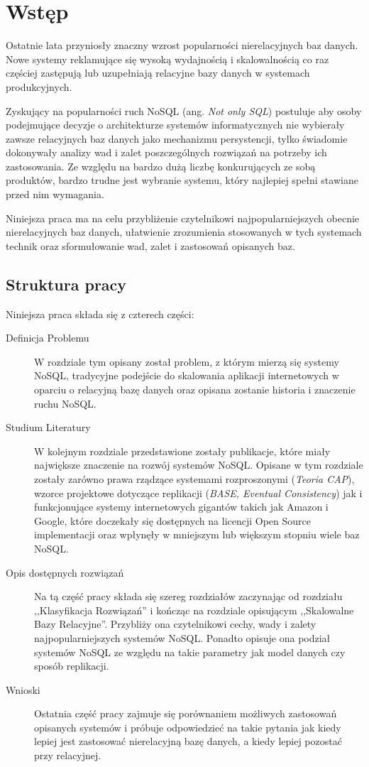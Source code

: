 \chapter{Wstęp}

Ostatnie lata przyniosły znaczny wzrost popularności nierelacyjnych baz danych.
Nowe systemy reklamujące się wysoką wydajnością i skalowalnością co raz częściej zastępują lub uzupełniają relacyjne bazy danych w systemach produkcyjnych.

Zyskujący na popularności ruch NoSQL (ang. \emph{Not only SQL}) postuluje aby osoby podejmujące decyzje o architekturze systemów informatycznych nie wybierały zawsze relacyjnych baz danych jako mechanizmu persystencji, tylko świadomie dokonywały analizy wad i zalet poszczególnych rozwiązań na potrzeby ich zastosowania.
Ze względu na bardzo dużą liczbę konkurujących ze sobą produktów, bardzo trudne jest wybranie systemu, który najlepiej spełni stawiane przed nim wymagania.

Niniejsza praca ma na celu przybliżenie czytelnikowi najpopularniejszych obecnie nierelacyjnych baz danych, ułatwienie zrozumienia stosowanych w tych systemach technik oraz sformułowanie wad, zalet i zastosowań opisanych baz.

\section{Struktura pracy}

Niniejsza praca składa się z czterech części:

\begin{description}
 \item[Definicja Problemu]
 W rozdziale tym opisany został problem, z którym mierzą się systemy NoSQL, tradycyjne podejście do skalowania aplikacji internetowych w oparciu o relacyjną bazę danych oraz opisana zostanie historia i znaczenie ruchu NoSQL.
 \item[Studium Literatury]
 W kolejnym rozdziale przedstawione zostały publikacje, które miały największe znaczenie na rozwój systemów NoSQL.
 Opisane w tym rozdziale zostały zarówno prawa rządzące systemami rozproszonymi (\emph{Teoria CAP}), wzorce projektowe dotyczące replikacji (\emph{BASE, Eventual Consistency}) jak i funkcjonujące systemy internetowych gigantów takich jak Amazon i Google, które doczekały się dostępnych na licencji Open Source implementacji oraz wpłynęły w mniejszym lub większym stopniu wiele baz NoSQL.
 \item[Opis dostępnych rozwiązań]
 Na tą część pracy składa się szereg rozdziałów zaczynając od rozdziału ,,Klasyfikacja Rozwiązań'' i kończąc na rozdziale opisującym ,,Skalowalne Bazy Relacyjne''.
 Przybliży ona czytelnikowi cechy, wady i zalety najpopularniejszych systemów NoSQL.
 Ponadto opisuje ona podział systemów NoSQL ze względu na takie parametry jak model danych czy sposób replikacji.
 \item[Wnioski]
 Ostatnia część pracy zajmuje się porównaniem możliwych zastosowań opisanych systemów i próbuje odpowiedzieć na takie pytania jak kiedy lepiej jest zastosować nierelacyjną bazę danych, a kiedy lepiej pozostać przy relacyjnej.
\end{description}

